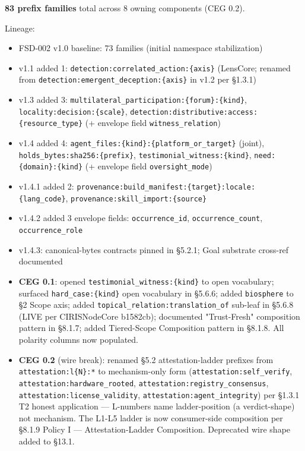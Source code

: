 \documentclass[10pt]{article}
\begin{document}
\textbf{83 prefix families} total across 8 owning components (CEG 0.2).


Lineage:

\begin{itemize}\setlength\itemsep{0pt}
\item FSD-002 v1.0 baseline: 73 families (initial namespace stabilization)
\item v1.1 added 1: \texttt{detection:correlated\_action:\{axis\}} (LensCore; renamed from \texttt{detection:emergent\_deception:\{axis\}} in v1.2 per §1.3.1)
\item v1.3 added 3: \texttt{multilateral\_participation:\{forum\}:\{kind\}}, \texttt{locality:decision:\{scale\}}, \texttt{detection:distributive:access:\{resource\_type\}} (+ envelope field \texttt{witness\_relation})
\item v1.4 added 4: \texttt{agent\_files:\{kind\}:\{platform\_or\_target\}} (joint), \texttt{holds\_bytes:sha256:\{prefix\}}, \texttt{testimonial\_witness:\{kind\}}, \texttt{need:\{domain\}:\{kind\}} (+ envelope field \texttt{oversight\_mode})
\item v1.4.1 added 2: \texttt{provenance:build\_manifest:\{target\}:locale:\{lang\_code\}}, \texttt{provenance:skill\_import:\{source\}}
\item v1.4.2 added 3 envelope fields: \texttt{occurrence\_id}, \texttt{occurrence\_count}, \texttt{occurrence\_role}
\item v1.4.3: canonical-bytes contracts pinned in §5.2.1; Goal substrate cross-ref documented
\item \textbf{CEG 0.1}: opened \texttt{testimonial\_witness:\{kind\}} to open vocabulary; surfaced \texttt{hard\_case:\{kind\}} open vocabulary in §5.6.6; added \texttt{biosphere} to §2 Scope axis; added \texttt{topical\_relation:translation\_of} sub-leaf in §5.6.8 (LIVE per CIRISNodeCore b1582cb); documented "Trust-Fresh" composition pattern in §8.1.7; added Tiered-Scope Composition pattern in §8.1.8. All polarity columns now populated.
\item \textbf{CEG 0.2} (wire break): renamed §5.2 attestation-ladder prefixes from \texttt{attestation:l\{N\}:*} to mechanism-only form (\texttt{attestation:self\_verify}, \texttt{attestation:hardware\_rooted}, \texttt{attestation:registry\_consensus}, \texttt{attestation:license\_validity}, \texttt{attestation:agent\_integrity}) per §1.3.1 T2 honest application — L-numbers name ladder-position (a verdict-shape) not mechanism. The L1-L5 ladder is now consumer-side composition per §8.1.9 Policy I — Attestation-Ladder Composition. Deprecated wire shape added to §13.1.

\end{itemize}
\end{document}
